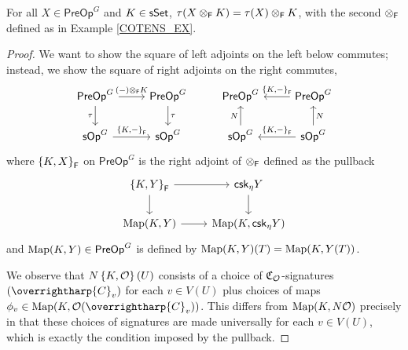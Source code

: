 \documentclass[a4paper,10pt
,draft
]{article}%
\renewcommand{\1}{\eta}%
\newcommand{\vect}[1]{\text{\overrightharp{\ensuremath{#1}}}}
\begin{document}
\begin{lemma}
      \label{TAUOTIMES_LEM}
      For all $X \in \mathsf{PreOp}^G$ and $K \in \mathsf{sSet}$, $\tau(X \otimes_{\mathsf{F}} K) = \tau(X) \otimes_{\mathsf{F}} K$,
      with the second $\otimes_{\mathsf{F}}$ defined as in Example \ref{COTENS_EX}.
\end{lemma}
\begin{proof}
      We want to show the square of left adjoints on the left below commutes;
      instead, we show the square of right adjoints on the right commutes,
      \[
            \begin{tikzcd}
                  \mathsf{PreOp}^G \arrow[d, "\tau"'] \arrow[r, "{(-) \otimes_\Fin K}"]
                  &
                  \mathsf{PreOp}^G \arrow[d, "\tau"]
                  & %
                  \mathsf{PreOp}^G
                  &
                  \mathsf{PreOp}^G \arrow[l, "\set{K,-}_\Fin"']
                  \\
                  \sOp^G \arrow[r, "\set{K,-}_\Fin"]
                  &
                  \sOp^G
                  & %
                  \sOp^G \arrow[u, "N"]
                  &
                  \sOp^G \arrow[l, "\set{K,-}_\Fin"'] \arrow[u, "N"']
            \end{tikzcd}
      \]
      where $\left\{K, X\right\}_{\mathsf{F}}$ on $\mathsf{PreOp}^G$ is the right adjoint of $\otimes_{\mathsf{F}}$ defined as the pullback
      \[
            \begin{tikzcd}
                  \set{K,Y}_\Fin \arrow[d] \arrow[r]
                  &
                  \mathsf{csk}_\eta Y \arrow[d]
                  \\
                  \Map(K, Y) \arrow[r]
                  &
                  \Map(K, \mathsf{csk}_\eta Y)
            \end{tikzcd}
      \]
      and $\operatorname{Map}(K, Y) \in \mathsf{PreOp}^G$ is defined by $\operatorname{Map}(K,Y)(T) = \operatorname{Map}(K, Y(T))$.

      We observe that $N\left\{K,\mathcal{O}\right\}(U)$ consists of a choice of $\mathfrak C_{\mathcal{O}}$-signatures $(\vect C_v)$ for each $v \in V(U)$ plus choices of maps $\phi_v \in \Map(K, \O(\vect C_v))$.
      This differs from $\operatorname{Map}(K, N\mathcal{O})$ precisely in that these choices of signatures are made universally for each $v \in V(U)$,
      which is exactly the condition imposed by the pullback.
\end{proof}
      
\end{document}
